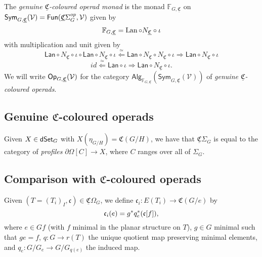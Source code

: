 \documentclass[a4paper,10pt
,draft
]{article}%
\newcommand{\UC}{\underline{\mathfrak C}}
\begin{document}
\begin{definition}
      The \textit{genuine $\UC$-coloured operad monad} is the monad
      $\mathbb F_{G,\UC}$ on $\Sym_{G, \UC}(\V) = \mathsf{Fun}(\UC\Sigma_G^{op}, \V)$ given by
      \begin{equation}
            \mathbb F_{G,\UC} = \Lan \circ N_{\UC} \circ \iota
      \end{equation}
      with multiplication and unit given by
      \begin{equation}
            \mathsf{Lan} \circ N_{\UC} \circ \iota \circ
            \mathsf{Lan} \circ N_{\UC} \circ \iota
            \overset{\simeq}{\Leftarrow}
            \mathsf{Lan} \circ N_{\UC} \circ  N_{\UC} \circ \iota
            \Rightarrow
            \mathsf{Lan} \circ N_{\UC} \circ \iota
      \end{equation}
      \begin{equation}
            id \overset{\simeq}{\Leftarrow} \mathsf{Lan} \circ \iota
            \Rightarrow
            \mathsf{Lan} \circ N_{\UC} \circ \iota.
      \end{equation}
      We will write $\Op_{G,\UC}(\V)$ for the category 
      $\mathsf{Alg}_{\mathbb{F}_{G,\UC}}(\mathsf{Sym}_{G,\UC}(\mathcal{V}))$ of \textit{genuine $\UC$-coloured operads}.
\end{definition}


\subsection{Genuine $\mathfrak C$-coloured operads}



\begin{remark}
      Given $X\in \mathsf{dSet}_G$ with $X(\eta_{G/H}) = \mathfrak C(G/H)$, we have that
      $\UC\Sigma_G$ is equal to the category of \textit{profiles} $\partial\Omega[C] \to X$,
      where $C$ ranges over all of $\Sigma_G$.
\end{remark}

\subsection{Comparison with $\mathfrak C$-coloured operads}

Given $(T = (T_i)_I, \mathfrak c) \in \UC\Omega_G$, we define
$\mathfrak c_i: E(T_i) \to \mathfrak C(G/e)$ by
\begin{equation}
      \mathfrak c_i(e) = g^{\**}q_e^{\**}(\mathfrak c[f]),
\end{equation}
where
$e \in Gf$ (with $f$ minimal in the planar structure on $T$),
$g\in G$ minimal such that $g e = f$,
$q: G \to r(T)$ the unique quotient map preserving minimal elements,
and $q_e:G/G_e \to G / G_{q(e)}$ the induced map.
\end{document}

